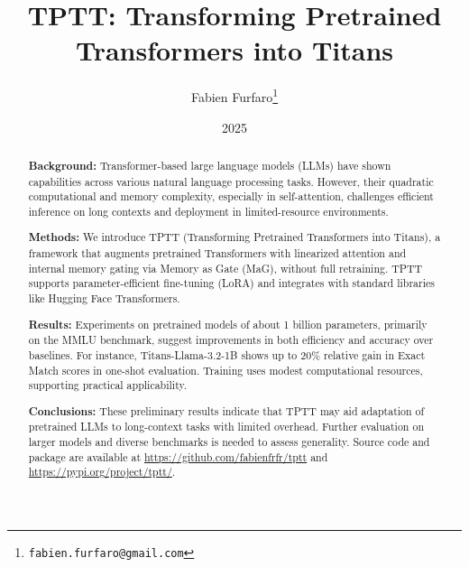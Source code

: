 \documentclass[10pt,a4paper]{article}
\title{\Large\textbf{TPTT: Transforming Pretrained Transformers into Titans}}
\author{\large Fabien Furfaro\thanks{\texttt{fabien.furfaro@gmail.com}}}
\date{\large 2025}
\begin{document}
\maketitle
    
\begin{abstract}
    \textbf{Background:} Transformer-based large language models (LLMs) have shown capabilities across various natural language processing tasks. However, their quadratic computational and memory complexity, especially in self-attention, challenges efficient inference on long contexts and deployment in limited-resource environments.

    \textbf{Methods:} We introduce TPTT (Transforming Pretrained Transformers into Titans), a framework that augments pretrained Transformers with linearized attention and internal memory gating via Memory as Gate (MaG), without full retraining. TPTT supports parameter-efficient fine-tuning (LoRA) and integrates with standard libraries like Hugging Face Transformers.

    \textbf{Results:} Experiments on pretrained models of about 1 billion parameters, primarily on the MMLU benchmark, suggest improvements in both efficiency and accuracy over baselines. For instance, Titans-Llama-3.2-1B shows up to 20\% relative gain in Exact Match scores in one-shot evaluation. Training uses modest computational resources, supporting practical applicability.

    \textbf{Conclusions:} These preliminary results indicate that TPTT may aid adaptation of pretrained LLMs to long-context tasks with limited overhead. Further evaluation on larger models and diverse benchmarks is needed to assess generality. Source code and package are available at \url{https://github.com/fabienfrfr/tptt} and \url{https://pypi.org/project/tptt/}.
\end{abstract}
\end{document}
